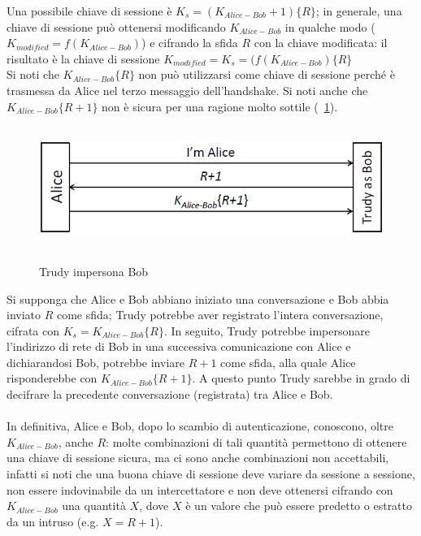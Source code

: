 Una possibile chiave di sessione è $K_{s} = (K_{Alice-Bob}+1)\lbrace R\rbrace$; in generale, una chiave di sessione può ottenersi modificando $K_{Alice-Bob}$ in qualche modo ($K_{modified} = f(K_{Alice-Bob})$) e cifrando la sfida $R$ con la chiave modificata: il risultato è la chiave di sessione $K_{modified} = K_{s} = (f(K_{Alice-Bob})\lbrace R\rbrace$\\
Si noti che $K_{Alice-Bob}\lbrace R\rbrace$ non può utilizzarsi come chiave di sessione perché è trasmessa da Alice nel terzo messaggio dell'handshake.
Si noti anche che $K_{Alice-Bob}\lbrace R+1\rbrace$ non è sicura per una ragione molto sottile (\figurename~\ref{fig:ImgS65bis}).
\begin{figure}[htbp]
	\centering%
	\subfigure%
	{\includegraphics[height=4cm, width=12cm, keepaspectratio]{Immagini/autenticazione/ImgS65bis.png}}
	\caption{Trudy impersona Bob}\label{fig:ImgS65bis} 	
\end{figure}
Si supponga che Alice e Bob abbiano iniziato una conversazione e Bob abbia inviato $R$ come sfida; Trudy potrebbe aver registrato l'intera conversazione, cifrata con $K_{s} = K_{Alice-Bob}\lbrace R\rbrace$. In seguito, Trudy potrebbe impersonare l'indirizzo di rete di Bob in una successiva comunicazione con Alice e dichiarandosi Bob, potrebbe inviare $R+1$ come sfida, alla quale Alice risponderebbe con $K_{Alice-Bob}\lbrace R+1\rbrace$. A questo punto Trudy sarebbe in grado di decifrare la precedente conversazione (registrata) tra Alice e Bob.\\ \\
In definitiva, Alice e Bob, dopo lo scambio di autenticazione, conoscono, oltre $K_{Alice-Bob}$, anche $R$: molte combinazioni di tali quantità permettono di ottenere una chiave di sessione sicura, ma ci sono anche combinazioni non accettabili, infatti si noti che una buona chiave di sessione deve variare da sessione a sessione, non essere indovinabile da un intercettatore e non deve ottenersi cifrando con $K_{Alice-Bob}$ una quantità $X$, dove $X$ è un valore che può essere predetto o estratto da un intruso (e.g. $X = R + 1$).
